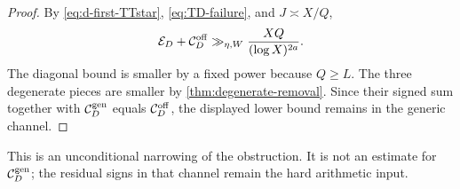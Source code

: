 \begin{proof}
By \eqref{eq:d-first-TTstar}, \eqref{eq:TD-failure}, and
$J\asymp X/Q$,
\[
 \mathcal E_D+\mathcal C_D^{\mathrm{off}}
 \gg_{\eta,W}\frac{XQ}{(\log X)^{2a}}.
\]
The diagonal bound is smaller by a fixed power because $Q\ge L$.
The three degenerate pieces are smaller by
\cref{thm:degenerate-removal}.  Since their signed sum together with
$\mathcal C_D^{\mathrm{gen}}$ equals $\mathcal C_D^{\mathrm{off}}$, the displayed
lower bound remains in the generic channel.
\end{proof}

This is an unconditional narrowing of the obstruction.  It is not an
estimate for $\mathcal C_D^{\mathrm{gen}}$; the residual signs in that channel
remain the hard arithmetic input.
